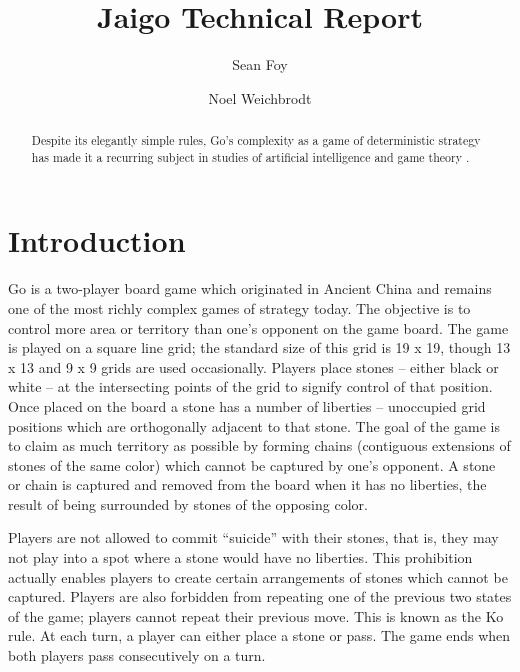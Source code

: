 \documentclass{memoir}
\title{Jaigo Technical Report}
\author{Sean Foy \and Noel Weichbrodt}
\begin{document}
	
\newtheorem{defn}{Definition}

\frontmatter
\begin{titlingpage}
\maketitle

\begin{abstract}
Despite its elegantly simple rules, Go's complexity as a game of deterministic strategy has made it a recurring subject in studies of artificial intelligence and game theory \cite{Muller2002}.
\end{abstract}
\end{titlingpage}

\tableofcontents
\listoftables
\lstlistoflistings

\mainmatter
\chapter{Introduction}
Go is a two-player board game which originated in Ancient China and remains one of the most richly complex games of strategy today. The objective is to control more area or territory than one's opponent on the game board. The game is played on a square line grid; the standard size of this grid is 19 x 19, though 13 x 13 and 9 x 9 grids are used occasionally. Players place stones -- either black or white -- at the intersecting points of the grid to signify control of that position. Once placed on the board a stone has a number of liberties -- unoccupied grid positions which are orthogonally adjacent to that stone. The goal of the game is to claim as much territory as possible by forming chains (contiguous extensions of stones of the same color) which cannot be captured by one's opponent. A stone or chain is captured and removed from the board when it has no liberties, the result of being surrounded by stones of the opposing color.

Players are not allowed to commit ``suicide'' with their stones, that is, they may not play into a spot where a stone would have no liberties. This prohibition actually enables players to create certain arrangements of stones which cannot be captured. Players are also forbidden from repeating one of the previous two states of the game; players cannot repeat their previous move. This is known as the Ko rule. At each turn, a player can either place a stone or pass. The game ends when both players pass consecutively on a turn.
\end{document}
